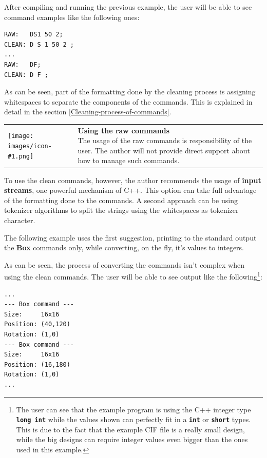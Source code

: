 \documentclass[11pt,twoside,openany,x11names,svgnames]{memoir}
\makeatletter
\newcommand{\IconNote}[3]
{
	\begin{table}[ht]
	\begin{tabular}{ lm{\dimexpr\textwidth-8\tabcolsep-\wd0}@{}}
		\toprule
		\texttt{[image: images/icon-\#1.png]}
		&
		\parbox[t]{155mm}{
		\textbf{#2} \\
		#3
		}
	\end{tabular}
\end{table}
}
\makeatother
\begin{document}


After compiling and running the previous example, the user will be able to see command examples like the following ones:

\begin{lstlisting}[frame=single,style=CPPStyle]
RAW:   DS1 50 2;
CLEAN: D S 1 50 2 ;
...
RAW:   DF;
CLEAN: D F ;
\end{lstlisting}

As can be seen, part of the formatting done by the cleaning process is assigning whitespaces to separate the components of the commands. This is explained in detail in the section \ref{Cleaning-process-of-commands}.

\IconNote
	{warning}
	{Using the raw commands}
	{The usage of the raw commands is responsibility of the user. The author will not provide direct support about how to manage such commands.}

To use the clean commands, however, the author recommends the usage of \textbf{input streams}, one powerful mechanism of C++. This option can take full advantage of the formatting done to the commands. A second approach can be using tokenizer algorithms to split the strings using the whitespaces as tokenizer character.

The following example uses the first suggestion, printing to the standard output the \textbf{Box} commands only, while converting, on the fly, it's values to integers.



As can be seen, the process of converting the commands isn't complex when using the clean commands. The user will be able to see output like the following\footnote{The user can see that the example program is using the C++ integer type \textbf{\texttt{long int}} while the values shown can perfectly fit in a \textbf{\texttt{int}} or \textbf{\texttt{short}} types. This is due to the fact that the example CIF file is a really small design, while the big designs can require integer values even bigger than the ones used in this example.}:

\begin{lstlisting}[frame=single,style=CPPStyle]
...
--- Box command ---
Size:     16x16
Position: (40,120)
Rotation: (1,0)
--- Box command ---
Size:     16x16
Position: (16,180)
Rotation: (1,0)
...
\end{lstlisting}
\end{document}
